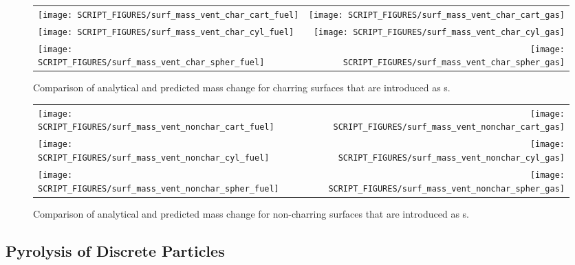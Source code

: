 \documentclass[11pt]{book}
\begin{document}
\begin{figure}[!htb]
\begin{tabular*}{\textwidth}{l@{\extracolsep{\fill}}r}
\texttt{[image: SCRIPT\_FIGURES/surf\_mass\_vent\_char\_cart\_fuel]} &
\texttt{[image: SCRIPT\_FIGURES/surf\_mass\_vent\_char\_cart\_gas]} \\
\texttt{[image: SCRIPT\_FIGURES/surf\_mass\_vent\_char\_cyl\_fuel]} &
\texttt{[image: SCRIPT\_FIGURES/surf\_mass\_vent\_char\_cyl\_gas]} \\
\texttt{[image: SCRIPT\_FIGURES/surf\_mass\_vent\_char\_spher\_fuel]} &
\texttt{[image: SCRIPT\_FIGURES/surf\_mass\_vent\_char\_spher\_gas]}
\end{tabular*}
\caption[The  test cases]{Comparison of analytical and predicted mass change for charring surfaces that are introduced as s.}
\label{surf_mass_vent_char}
\end{figure}

\begin{figure}[p]
\noindent
\begin{tabular*}{\textwidth}{l@{\extracolsep{\fill}}r}
\texttt{[image: SCRIPT\_FIGURES/surf\_mass\_vent\_nonchar\_cart\_fuel]} &
\texttt{[image: SCRIPT\_FIGURES/surf\_mass\_vent\_nonchar\_cart\_gas]} \\
\texttt{[image: SCRIPT\_FIGURES/surf\_mass\_vent\_nonchar\_cyl\_fuel]} &
\texttt{[image: SCRIPT\_FIGURES/surf\_mass\_vent\_nonchar\_cyl\_gas]} \\
\texttt{[image: SCRIPT\_FIGURES/surf\_mass\_vent\_nonchar\_spher\_fuel]} &
\texttt{[image: SCRIPT\_FIGURES/surf\_mass\_vent\_nonchar\_spher\_gas]}
\end{tabular*}
\caption[The  test cases]{Comparison of analytical and predicted mass change for non-charring surfaces that are introduced as s.}
\label{surf_mass_vent_nonchar}
\end{figure}


\subsection{Pyrolysis of Discrete Particles}

\label{surf_mass_part_char_cart_fuel}
\label{surf_mass_part_char_cart_gas}
\label{surf_mass_part_char_cyl_fuel}
\label{surf_mass_part_char_cyl_gas}
\label{surf_mass_part_char_spher_fuel}
\label{surf_mass_part_char_spher_gas}
\label{surf_mass_part_nonchar_cart_fuel}
\label{surf_mass_part_nonchar_cart_gas}
\label{surf_mass_part_nonchar_cyl_fuel}
\label{surf_mass_part_nonchar_cyl_gas}
\label{surf_mass_part_nonchar_spher_fuel}
\label{surf_mass_part_nonchar_spher_gas}
\end{document}
